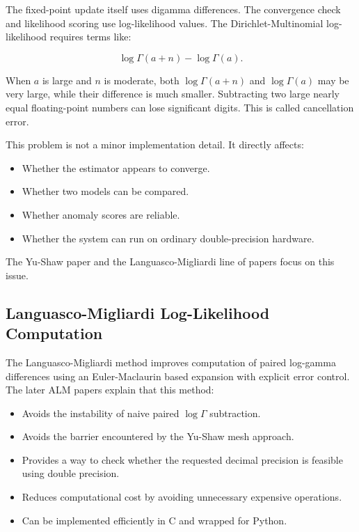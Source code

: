 \documentclass[11pt,a4paper]{article}
\begin{document}
The fixed-point update itself uses digamma differences. The convergence check and likelihood scoring use log-likelihood values. The Dirichlet-Multinomial log-likelihood requires terms like:

\[
\log\Gamma(a+n)-\log\Gamma(a).
\]

When \(a\) is large and \(n\) is moderate, both \(\log\Gamma(a+n)\) and \(\log\Gamma(a)\) may be very large, while their difference is much smaller. Subtracting two large nearly equal floating-point numbers can lose significant digits. This is called cancellation error.

This problem is not a minor implementation detail. It directly affects:

\begin{itemize}
  \item Whether the estimator appears to converge.
  \item Whether two models can be compared.
  \item Whether anomaly scores are reliable.
  \item Whether the system can run on ordinary double-precision hardware.
\end{itemize}

The Yu-Shaw paper and the Languasco-Migliardi line of papers focus on this issue.

\subsection{Languasco-Migliardi Log-Likelihood Computation}

The Languasco-Migliardi method improves computation of paired log-gamma differences using an Euler-Maclaurin based expansion with explicit error control. The later ALM papers explain that this method:

\begin{itemize}
  \item Avoids the instability of naive paired \(\log\Gamma\) subtraction.
  \item Avoids the barrier encountered by the Yu-Shaw mesh approach.
  \item Provides a way to check whether the requested decimal precision is feasible using double precision.
  \item Reduces computational cost by avoiding unnecessary expensive operations.
  \item Can be implemented efficiently in C and wrapped for Python.
\end{itemize}
\end{document}
